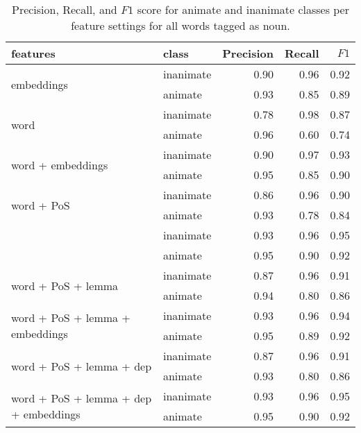 \documentclass[a4paper,UKenglish]{oasics}
\begin{document}
\begin{table}
\centering
\begin{tabular}{llrrr}
\toprule
features & class &  Precision &  Recall & $F1$ \\
\midrule
\multirow{2}{*}{embeddings}                            & inanimate     &       0.90 &    0.96 &    0.92  \\
                                                       & animate       &       0.93 &    0.85 &    0.89  \\
\multirow{2}{*}{word}                                  & inanimate     &       0.78 &    0.98 &    0.87  \\
                                                       & animate       &       0.96 &    0.60 &    0.74  \\
\multirow{2}{*}{word + embeddings}                     & inanimate     &       0.90 &    0.97 &    0.93  \\
                                                       & animate       &       0.95 &    0.85 &    0.90  \\
\multirow{2}{*}{word + PoS}                            & inanimate     &       0.86 &    0.96 &    0.90  \\
                                                       & animate       &       0.93 &    0.78 &    0.84  \\
\rowcolor{Gray}                                        & inanimate     &       0.93 &    0.96 &    0.95  \\
\rowcolor{Gray}\multirow{-2}{*}{word + PoS + embeddings} & animate       &       0.95 &    0.90 &    0.92\\
\multirow{2}{*}{word + PoS + lemma}                    & inanimate     &       0.87 &    0.96 &    0.91  \\
                                                       & animate       &       0.94 &    0.80 &    0.86  \\
\multirow{2}{*}{word + PoS + lemma + embeddings}       & inanimate     &       0.93 &    0.96 &    0.94  \\
                                                       & animate       &       0.95 &    0.89 &    0.92  \\
\multirow{2}{*}{word + PoS + lemma + dep}              & inanimate     &       0.87 &    0.96 &    0.91  \\
                                                       & animate       &       0.93 &    0.80 &    0.86  \\
\multirow{2}{*}{word + PoS + lemma + dep + embeddings} & inanimate     &       0.93 &    0.96 &    0.95  \\
                                                       & animate       &       0.95 &    0.90 &    0.92  \\
\bottomrule
\end{tabular}
\caption{Precision, Recall, and $F1$ score for animate and inanimate classes
  per feature settings for all words tagged as noun.}
\label{tab:results-noun}
\end{table}
\end{document}

